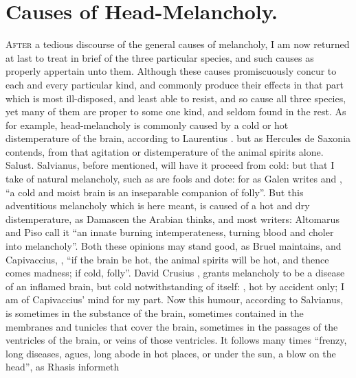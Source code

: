 \section{Causes of Head-Melancholy.}

\lettrine{A}{fter} a tedious discourse of the general causes of melancholy, I
am now returned at last to treat in brief of the three particular species, and
such causes as properly appertain unto them. Although these causes
promiscuously concur to each and every particular kind, and commonly produce
their effects in that part which is most ill-disposed, and least able to
resist, and so cause all three species, yet many of them are proper to some one
kind, and seldom found in the rest. As for example, head-melancholy is commonly
caused by a cold or hot distemperature of the brain, according to Laurentius
. but as Hercules de
Saxonia contends, from that agitation or distemperature of the animal spirits
alone. Salust. Salvianus, before mentioned,  will have it proceed from cold: but that I take of natural
melancholy, such as are fools and dote: for as Galen writes
 and \Avicenna{},
\enquote{a cold and moist brain is an inseparable companion of
folly}. But this adventitious melancholy which is here meant, is caused of a
hot and dry distemperature, as Damascen the Arabian
 thinks, and most writers: Altomarus and
Piso call it \enquote{an innate burning intemperateness, turning
blood and choler into melancholy}. Both these opinions may stand good, as Bruel
maintains, and Capivaccius, ,
\enquote{if the brain be hot, the animal spirits will be hot, and
thence comes madness; if cold, folly}. David Crusius
,
grants melancholy to be a disease of an inflamed brain, but cold
notwithstanding of itself: , hot by
accident only; I am of Capivaccius' mind for my part. Now this humour,
according to Salvianus, is sometimes in the substance of the brain, sometimes
contained in the membranes and tunicles that cover the brain, sometimes in the
passages of the ventricles of the brain, or veins of those ventricles. It
follows many times \enquote{frenzy, long diseases, agues, long
abode in hot places, or under the sun, a blow on the head}, as Rhasis informeth
